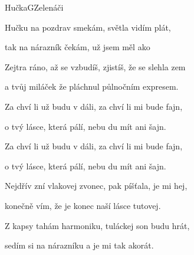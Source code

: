 \begin{song}{Hučka}{G}{Zelenáči}
\begin{SBVerse}
Hučku  na pozdrav smekám, světla  vidím plát,

tak na  nárazník čekám, už jsem  měl ako

Zejtra ráno, až se vzbudíš, zjistíš, že se slehla zem

a tvůj miláček že pláchnul půlnočním expresem.
\end{SBVerse}
\begin{SBChorus}
Za chví li už budu v dáli, za chví li mi bude fajn,

o tvý  lásce, která pálí, nebu du mít ani  šajn.

Za chví li už budu v dáli, za chví li mi bude fajn,

o tvý  lásce, která pálí, nebu du mít ani  šajn.
\end{SBChorus}
\begin{SBVerse}
Nejdřív zní vlakovej zvonec, pak píšťala, je mi hej,

konečně vím, že je konec naší lásce tutovej.

Z kapsy tahám harmoniku, tuláckej son budu hrát,

sedím si na nárazníku a je mi tak akorát. 
\end{SBVerse}
\end{song}

\pagebreak